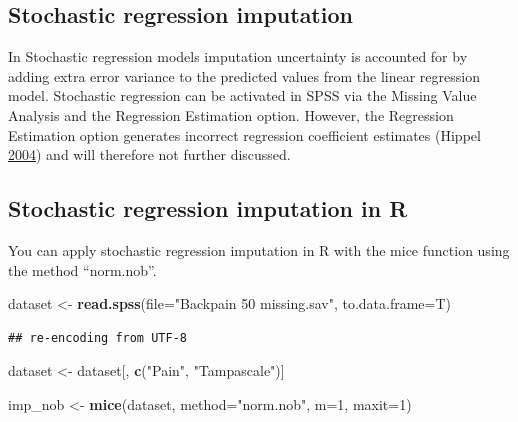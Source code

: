 \documentclass[
]{book}
\newenvironment{Shaded}{\begin{snugshade}}{\end{snugshade}}
\newcommand{\DataTypeTok}[1]{\textcolor[rgb]{0.13,0.29,0.53}{#1}}
\newcommand{\DecValTok}[1]{\textcolor[rgb]{0.00,0.00,0.81}{#1}}
\newcommand{\KeywordTok}[1]{\textcolor[rgb]{0.13,0.29,0.53}{\textbf{#1}}}
\newcommand{\NormalTok}[1]{#1}
\newcommand{\StringTok}[1]{\textcolor[rgb]{0.31,0.60,0.02}{#1}}
\begin{document}
\hypertarget{stochastic-regression-imputation}{%
\subsection{Stochastic regression
imputation}\label{stochastic-regression-imputation}}

In Stochastic regression models imputation uncertainty is accounted for
by adding extra error variance to the predicted values from the linear
regression model. Stochastic regression can be activated in SPSS via the
Missing Value Analysis and the Regression Estimation option. However,
the Regression Estimation option generates incorrect regression
coefficient estimates (Hippel \protect\hyperlink{ref-hippel2004}{2004})
and will therefore not further discussed.

\hypertarget{stochastic-regression-imputation-in-r}{%
\subsection{Stochastic regression imputation in
R}\label{stochastic-regression-imputation-in-r}}

You can apply stochastic regression imputation in R with the mice
function using the method ``norm.nob''.

\begin{Shaded}
\begin{Highlighting}[]
\NormalTok{dataset <-}\StringTok{ }\KeywordTok{read.spss}\NormalTok{(}\DataTypeTok{file=}\StringTok{"Backpain 50 missing.sav"}\NormalTok{, }\DataTypeTok{to.data.frame=}\NormalTok{T)}
\end{Highlighting}
\end{Shaded}

\begin{verbatim}
## re-encoding from UTF-8
\end{verbatim}

\begin{Shaded}
\begin{Highlighting}[]
\NormalTok{dataset <-}\StringTok{ }\NormalTok{dataset[, }\KeywordTok{c}\NormalTok{(}\StringTok{"Pain"}\NormalTok{, }\StringTok{"Tampascale"}\NormalTok{)]}

\NormalTok{imp_nob <-}\StringTok{ }\KeywordTok{mice}\NormalTok{(dataset, }\DataTypeTok{method=}\StringTok{"norm.nob"}\NormalTok{, }\DataTypeTok{m=}\DecValTok{1}\NormalTok{, }\DataTypeTok{maxit=}\DecValTok{1}\NormalTok{)}
\end{Highlighting}
\end{Shaded}
\end{document}
